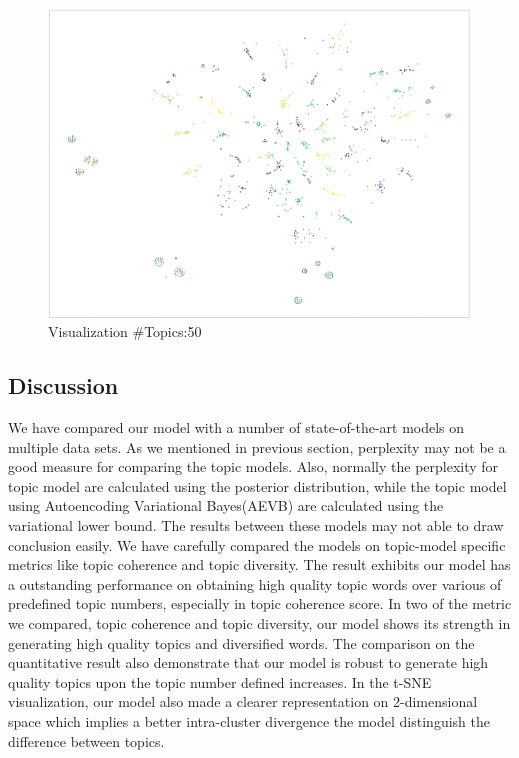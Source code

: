 \begin{figure}
\centering
\includegraphics[width=1\linewidth]{figures/0908/tsne_50t_25w_0.png}
\caption{Visualization \#Topics:50}
\label{fig:tsne50t25w0}
\end{figure}
\subsection{Discussion}
We have compared our model with a number of state-of-the-art models on multiple data sets. 
As we mentioned in previous section, perplexity may not be a good measure for comparing the topic models. Also, normally the perplexity for topic model are calculated using the posterior distribution, while the topic model using Autoencoding Variational Bayes(AEVB) are calculated using the variational lower bound\cite{srivastava_autoencoding_2017}. The results between these models may not able to draw conclusion easily. We have carefully compared the models on topic-model specific metrics like topic coherence and topic diversity. The result exhibits our model has a outstanding performance on obtaining high quality topic words over various of predefined topic numbers, especially in topic coherence score. In two of the metric we compared, topic coherence and topic diversity, our model shows its strength in generating high quality topics and diversified words. The comparison on the quantitative result also demonstrate that our model is robust to generate high quality topics upon the topic number defined increases.
In the t-SNE visualization, our model also made a clearer representation on 2-dimensional space which implies a better intra-cluster divergence the model distinguish the difference between topics.